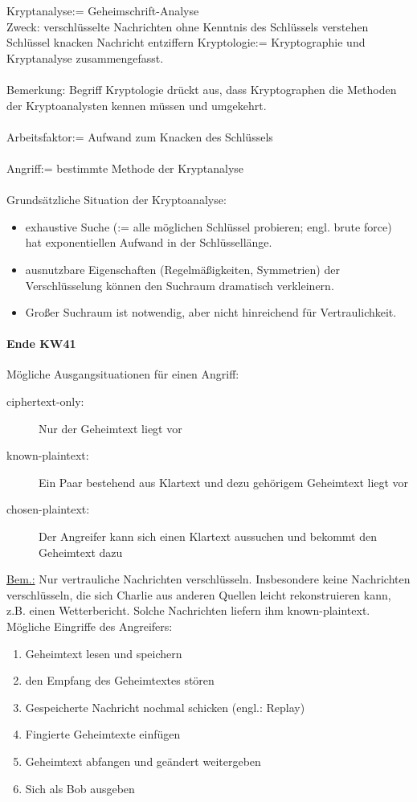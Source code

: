 \documentclass[a4paper,12pt]{article}
\begin{document}
Kryptanalyse:= Geheimschrift-Analyse\\
Zweck: verschlüsselte Nachrichten ohne Kenntnis des Schlüssels verstehen\\
\glqq{} Schlüssel knacken\grqq{} \glqq{}Nachricht entziffern\grqq{}
Kryptologie:= Kryptographie und Kryptanalyse zusammengefasst.\\
\\
Bemerkung: Begriff Kryptologie drückt aus, dass Kryptographen die Methoden der Kryptoanalysten kennen müssen und umgekehrt.\\
\\
Arbeitsfaktor:= Aufwand zum Knacken des Schlüssels\\
\\
Angriff:= bestimmte Methode der Kryptanalyse\\
\\
Grundsätzliche Situation der Kryptoanalyse:
\begin{itemize}
 \item exhaustive Suche (:= alle möglichen Schlüssel probieren; engl. brute force) hat exponentiellen Aufwand in der Schlüssellänge.
 \item ausnutzbare Eigenschaften (Regelmäßigkeiten, Symmetrien) der Verschlüsselung können den Suchraum dramatisch verkleinern.
 \item Großer Suchraum ist notwendig, aber nicht hinreichend für Vertraulichkeit.
\end{itemize}

\paragraph{Ende KW41}

Mögliche Ausgangsituationen für einen Angriff:
\begin{description}
 \item[ciphertext-only:] Nur der Geheimtext liegt vor
 \item[known-plaintext:] Ein Paar bestehend aus Klartext und dezu gehörigem Geheimtext liegt vor
 \item[chosen-plaintext:] Der Angreifer kann sich einen Klartext aussuchen und bekommt den Geheimtext dazu
\end{description}

\underline{Bem.:} Nur vertrauliche Nachrichten verschlüsseln. Insbesondere keine Nachrichten verschlüsseln, die sich Charlie aus anderen Quellen leicht rekonstruieren kann, z.B. einen Wetterbericht. Solche Nachrichten liefern ihm known-plaintext.\\
Mögliche Eingriffe des Angreifers:
\begin{enumerate}
 \item Geheimtext lesen und speichern
 \item den Empfang des Geheimtextes stören
 \item Gespeicherte Nachricht nochmal schicken (engl.: Replay)
 \item Fingierte Geheimtexte einfügen
 \item Geheimtext abfangen und geändert weitergeben
 \item Sich als Bob ausgeben
\end{enumerate}
\end{document}
